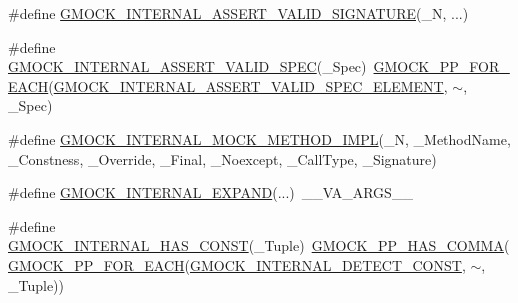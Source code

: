 \begin{DoxyCompactItemize}
\item 
\#define \mbox{\hyperlink{_obj__test_2lib_2googletest-master_2googlemock_2include_2gmock_2gmock-function-mocker_8h_a8482159ed8d8653920702922d6336942}{G\+M\+O\+C\+K\+\_\+\+I\+N\+T\+E\+R\+N\+A\+L\+\_\+\+A\+S\+S\+E\+R\+T\+\_\+\+V\+A\+L\+I\+D\+\_\+\+S\+I\+G\+N\+A\+T\+U\+RE}}(\+\_\+N, ...)
\item 
\#define \mbox{\hyperlink{_obj__test_2lib_2googletest-master_2googlemock_2include_2gmock_2gmock-function-mocker_8h_a0007a0efee3360bb4b5478b597e35ee7}{G\+M\+O\+C\+K\+\_\+\+I\+N\+T\+E\+R\+N\+A\+L\+\_\+\+A\+S\+S\+E\+R\+T\+\_\+\+V\+A\+L\+I\+D\+\_\+\+S\+P\+EC}}(\+\_\+\+Spec)~\mbox{\hyperlink{_obj__test_2lib_2googletest-master_2googlemock_2include_2gmock_2internal_2gmock-pp_8h_abc9368d9b0960531e3cfb9e5d6a41816}{G\+M\+O\+C\+K\+\_\+\+P\+P\+\_\+\+F\+O\+R\+\_\+\+E\+A\+CH}}(\mbox{\hyperlink{_obj__test_2lib_2googletest-master_2googlemock_2include_2gmock_2gmock-function-mocker_8h_a6043d8b0a21556d205e729fa9c8da600}{G\+M\+O\+C\+K\+\_\+\+I\+N\+T\+E\+R\+N\+A\+L\+\_\+\+A\+S\+S\+E\+R\+T\+\_\+\+V\+A\+L\+I\+D\+\_\+\+S\+P\+E\+C\+\_\+\+E\+L\+E\+M\+E\+NT}}, $\sim$, \+\_\+\+Spec)
\item 
\#define \mbox{\hyperlink{_obj__test_2lib_2googletest-master_2googlemock_2include_2gmock_2gmock-function-mocker_8h_ad1e468db8897a7e26c6223b94da046a6}{G\+M\+O\+C\+K\+\_\+\+I\+N\+T\+E\+R\+N\+A\+L\+\_\+\+M\+O\+C\+K\+\_\+\+M\+E\+T\+H\+O\+D\+\_\+\+I\+M\+PL}}(\+\_\+N,  \+\_\+\+Method\+Name,  \+\_\+\+Constness,  \+\_\+\+Override,  \+\_\+\+Final,  \+\_\+\+Noexcept,  \+\_\+\+Call\+Type,  \+\_\+\+Signature)
\item 
\#define \mbox{\hyperlink{_obj__test_2lib_2googletest-master_2googlemock_2include_2gmock_2gmock-function-mocker_8h_a89ec7e283a9d924e9cfd92d45b9bbebd}{G\+M\+O\+C\+K\+\_\+\+I\+N\+T\+E\+R\+N\+A\+L\+\_\+\+E\+X\+P\+A\+ND}}(...)~\+\_\+\+\_\+\+V\+A\+\_\+\+A\+R\+G\+S\+\_\+\+\_\+
\item 
\#define \mbox{\hyperlink{_obj__test_2lib_2googletest-master_2googlemock_2include_2gmock_2gmock-function-mocker_8h_a3fc6f99ce89d5117fcc366d44423a9f2}{G\+M\+O\+C\+K\+\_\+\+I\+N\+T\+E\+R\+N\+A\+L\+\_\+\+H\+A\+S\+\_\+\+C\+O\+N\+ST}}(\+\_\+\+Tuple)~\mbox{\hyperlink{_obj__test_2lib_2googletest-master_2googlemock_2include_2gmock_2internal_2gmock-pp_8h_aaf83e01e56eb26d7eac9efb477587510}{G\+M\+O\+C\+K\+\_\+\+P\+P\+\_\+\+H\+A\+S\+\_\+\+C\+O\+M\+MA}}(\mbox{\hyperlink{_obj__test_2lib_2googletest-master_2googlemock_2include_2gmock_2internal_2gmock-pp_8h_abc9368d9b0960531e3cfb9e5d6a41816}{G\+M\+O\+C\+K\+\_\+\+P\+P\+\_\+\+F\+O\+R\+\_\+\+E\+A\+CH}}(\mbox{\hyperlink{_obj__test_2lib_2googletest-master_2googlemock_2include_2gmock_2gmock-function-mocker_8h_a3db348fab7c9ba65b3c9f4a7c1a9b3cc}{G\+M\+O\+C\+K\+\_\+\+I\+N\+T\+E\+R\+N\+A\+L\+\_\+\+D\+E\+T\+E\+C\+T\+\_\+\+C\+O\+N\+ST}}, $\sim$, \+\_\+\+Tuple))

\end{DoxyCompactItemize}

